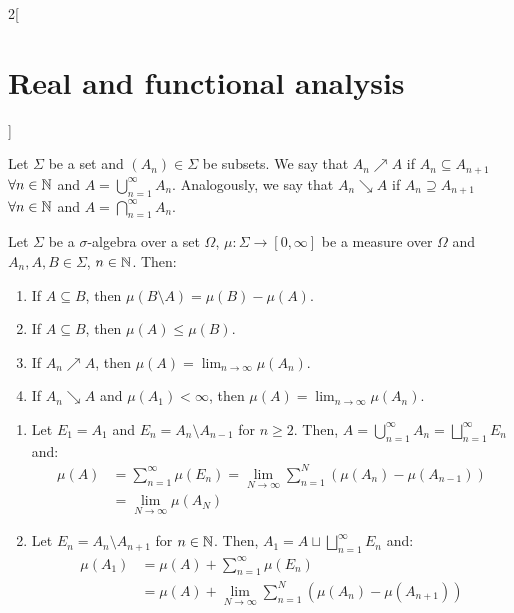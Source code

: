 \documentclass[../../../main_math.tex]{subfiles}
\begin{document}
\begin{multicols}{2}[\section{Real and functional analysis}]
\begin{definition}[Measure]
\begin{enumerate}[ref = $\sigma$-additivity]
    \end{enumerate}
  \end{definition}
  \begin{definition}
    Let $\Sigma$ be a set and $(A_n)\in\Sigma$ be subsets. We say that $A_n\nearrow A$ if $A_n\subseteq A_{n+1}$ $\forall n\in\mathbb{N}$ and $A=\bigcup_{n=1}^\infty A_n$. Analogously, we say that $A_n\searrow A$ if $A_n\supseteq A_{n+1}$ $\forall n\in\mathbb{N}$ and $A=\bigcap_{n=1}^\infty A_n$.
  \end{definition}
  \begin{proposition}
    Let $\Sigma$ be a $\sigma$-algebra over a set $\Omega$, $\mu:\Sigma\longrightarrow[0,\infty]$ be a measure over $\Omega$ and $A_n,A,B\in\Sigma$, $n\in\mathbb{N}$. Then:
    \begin{enumerate}
      \item If $A\subseteq B$, then $\mu(B\setminus A)=\mu(B)-\mu(A)$.
      \item If $A\subseteq B$, then $\mu(A)\leq\mu(B)$.
            \item\label{RFA:incresingseq} If $A_n\nearrow A$, then $\displaystyle\mu(A)=\lim_{n\to\infty} \mu(A_n)$.
            \item\label{RFA:decresingseq} If $A_n\searrow A$ and $\mu(A_1)<\infty$, then $\displaystyle\mu(A)=\lim_{n\to\infty} \mu(A_n)$.
    \end{enumerate}
  \end{proposition}
  \begin{sproof}
    \begin{enumerate}
      \doubleitem $$\mu(B)=\mu(A\sqcup (B\setminus A))=\mu(A) +\mu(B\setminus A)$$
      \item Let $E_1=A_1$ and $E_n=A_n\setminus A_{n-1}$ for $n\geq 2$. Then, $A=\bigcup_{n=1}^\infty A_n=\bigsqcup_{n=1}^\infty E_n$ and:
            \begin{align*}
              \mu(A) & =\sum_{n=1}^\infty \mu(E_n)=\lim_{N\to\infty}\sum_{n=1}^N(\mu(A_n)-\mu(A_{n-1})) \\
                     & =\lim_{N\to\infty}\mu(A_N)
            \end{align*}
      \item Let $E_n=A_{n}\setminus A_{n+1}$ for $n\in\mathbb{N}$. Then, $A_1=A\sqcup\bigsqcup_{n=1}^\infty E_n$ and:
            \begin{align*}
              \mu(A_1) & =\mu(A)+\sum_{n=1}^\infty \mu(E_n)                           \\
                       & =\mu(A)+\lim_{N\to\infty}\sum_{n=1}^N(\mu(A_n)-\mu(A_{n+1})) \\

\end{align*}
\end{enumerate}
\end{sproof}
\end{multicols}
\end{document}
